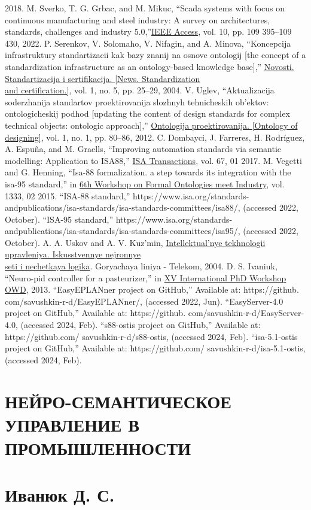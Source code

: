 \documentclass[7pt]{article} \twocolumn
\begin{document}
\begin{center}
\begin{thebibliography}{20}
2018.
 M. Sverko, T. G. Grbac, and M. Mikuc, “Scada systems with
focus on continuous manufacturing and steel industry: A survey
on architectures, standards, challenges and industry 5.0,”\underline{IEEE
Access}, vol. 10, pp. 109 395–109 430, 2022.
  P. Serenkov, V. Solomaho, V. Nifagin, and A. Minova, “Koncepcija infrastruktury standartizacii kak bazy znanij na osnove
ontologij [the concept of a standardization infrastructure as
an ontology-based knowledge base],” \underline{Novosti. Standartizacija i
sertifikacija. [News. Standardization} \\ \underline{and certification.]}, vol. 1,
no. 5, pp. 25–29, 2004.
 V. Uglev, “Aktualizacija soderzhanija standartov proektirovanija
slozhnyh tehnicheskih ob’ektov: ontologicheskij podhod [updating the content of design standards for complex technical objects:
ontologic approach],” \underline{Ontologija proektirovanija. [Ontology of
designing]}, vol. 1, no. 1, pp. 80–86, 2012.
 C. Dombayci, J. Farreres, H. Rodríguez, A. Espuña, and
M. Graells, “Improving automation standards via semantic modelling: Application to ISA88,” \underline{ISA Transactions}, vol. 67, 01 2017.
 M. Vegetti and G. Henning, “Isa-88 formalization. a step towards
its integration with the isa-95 standard,” in \underline{6th Workshop on
Formal Ontologies meet Industry}, vol. 1333, 02 2015.
 “ISA-88 standard,” https://www.isa.org/standards-andpublications/isa-standards/isa-standards-committees/isa88/,
(accessed 2022, October).
 “ISA-95 standard,” https://www.isa.org/standards-andpublications/isa-standards/isa-standards-committees/isa95/,
(accessed 2022, October).
  A. A. Uskov and A. V. Kuz’min,  \underline{Intellektual’nye 
 tekhnologii
upravleniya. Iskusstvennye nejronnye} \\ \underline{seti  i nechetkaya logika}.
Goryachaya liniya   -   Telekom, 2004.
  D. S. Ivaniuk, “Neuro-pid controller for a pasteurizer,” in
\underline{XV International PhD Workshop OWD}, 2013.
 “EasyEPLANner project on GitHub,” Available at: https://github.
com/savushkin-r-d/EasyEPLANner/, (accessed 2022, Jun).
 “EasyServer-4.0 project on GitHub,” Available at: https://github.
com/savushkin-r-d/EasyServer-4.0, (accessed 2024, Feb).
 “s88-ostis project on GitHub,” Available at: https://github.com/
savushkin-r-d/s88-ostis, (accessed 2024, Feb).
 “isa-5.1-ostis project on GitHub,” Available at: https://github.com/
savushkin-r-d/isa-5.1-ostis, (accessed 2024, Feb).
\end{thebibliography}
\section*{\textbf{НЕЙРО-СЕМАНТИЧЕСКОЕ \\ УПРАВЛЕНИЕ В \\ ПРОМЫШЛЕННОСТИ}}
\section*{\large Иванюк Д. С.}
\end{center}
\end{document}

